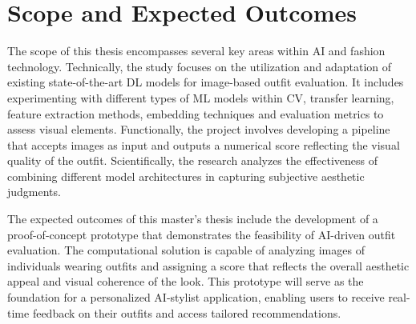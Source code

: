 \newpage

\section{Scope and Expected Outcomes}

The scope of this thesis encompasses several key areas within \acs{AI} and fashion technology. Technically, the study focuses on the utilization and adaptation of existing state-of-the-art \acs{DL} models for image-based outfit evaluation. It includes experimenting with different types of \acs{ML} models within \acs{CV}, transfer learning, feature extraction methods, embedding techniques and evaluation metrics to assess visual elements. Functionally, the project involves developing a pipeline that accepts images as input and outputs a numerical score reflecting the visual quality of the outfit. Scientifically, the research analyzes the effectiveness of combining different model architectures in capturing subjective aesthetic judgments.

The expected outcomes of this master's thesis include the development of a proof-of-concept prototype that demonstrates the feasibility of \acs{AI}-driven outfit evaluation. The computational solution is capable of analyzing images of individuals wearing outfits and assigning a score that reflects the overall aesthetic appeal and visual coherence of the look. This prototype will serve as the foundation for a personalized \acs{AI}-stylist application, enabling users to receive real-time feedback on their outfits and access tailored recommendations.